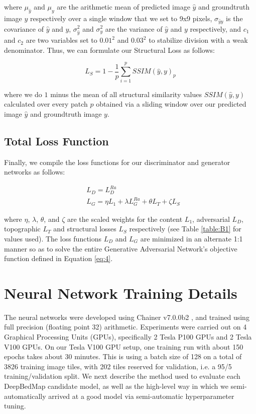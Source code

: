 \documentclass[tc, manuscript]{copernicus}
\begin{document}
where $\mu_{\hat{y}}$ and $\mu_y$ are the arithmetic mean of predicted image ${\hat{y}}$ and groundtruth image $y$ respectively over a single window that we set to 9x9 pixels, $\sigma_{{\hat{y}}y}$ is the covariance of ${\hat{y}}$ and $y$, $\sigma_{\hat{y}}^2$ and $\sigma_y^2$ are the variance of ${\hat{y}}$ and $y$ respectively, and $c_1$ and $c_2$ are two variables set to $0.01^2$ and $0.03^2$ to stabilize division with a weak denominator.
Thus, we can formulate our Structural Loss as follows:

\begin{equation}\label{eq:A7}
  L_S = 1 - \dfrac{1}{p} \sum\limits_{i=1}^p SSIM(\hat{y}, y)_p
\end{equation}

where we do $1$ minus the mean of all structural similarity values $SSIM(\hat{y}, y)$ calculated over every patch $p$ obtained via a sliding window over our predicted image ${\hat{y}}$ and groundtruth image $y$.

\subsection{Total Loss Function}

Finally, we compile the loss functions for our discriminator and generator networks as follows:

\begin{align}
  & L_D = L_D^{Ra} \label{eq:A8}\\
  & L_G = \eta L_1 + \lambda L_G^{Ra} + \theta L_T + \zeta L_S \label{eq:A9}
\end{align}

where $\eta$, $\lambda$, $\theta$, and $\zeta$ are the scaled weights for the content $L_1$, adversarial $L_D$, topographic $L_T$ and structural losses $L_S$ respectively (see Table \ref{table:B1} for values used).
The loss functions $L_D$ and $L_G$ are minimized in an alternate 1:1 manner so as to solve the entire Generative Adversarial Network's objective function defined in Equation \eqref{eq:4}.


\section{Neural Network Training Details} \label{appendix:B}

The neural networks were developed using Chainer v7.0.0b2 \citep{TokuiChainerDeepLearning2019}, and trained using full precision (floating point 32) arithmetic.
Experiments were carried out on 4 Graphical Processing Units (GPUs), specifically 2 Tesla P100 GPUs and 2 Tesla V100 GPUs.
On our Tesla V100 GPU setup, one training run with about 150 epochs takes about 30 minutes.
This is using a batch size of 128 on a total of 3826 training image tiles, with 202 tiles reserved for validation, i.e. a 95/5 training/validation split.
We next describe the method used to evaluate each DeepBedMap candidate model, as well as the high-level way in which we semi-automatically arrived at a good model via semi-automatic hyperparameter tuning.
\end{document}

